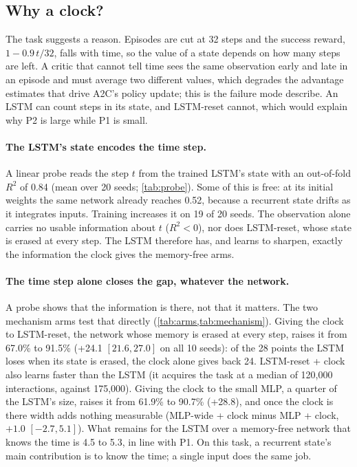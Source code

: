 \subsection{Why a clock?}
\label{sec:part2-why}

The task suggests a reason. Episodes are cut at 32 steps and the
success reward, $1-0.9\,t/32$, falls with time, so the value of a state depends on how many steps
are left. A critic that cannot tell time sees the same observation early and late in an episode
and must average two different values, which degrades the advantage estimates that drive A2C's
policy update; this is the failure mode \citet{pardo2018timelimits} describe. An LSTM can count
steps in its state, and LSTM-reset cannot, which would explain why P2 is large while P1 is small.

\paragraph{The LSTM's state encodes the time step.}
A linear probe reads the step $t$ from the trained LSTM's state with an out-of-fold $R^2$ of 0.84
(mean over 20 seeds; \cref{tab:probe}). Some of this is free: at its initial weights the same
network already reaches 0.52, because a recurrent state drifts as it integrates inputs. Training
increases it on 19 of 20 seeds. The observation alone carries no usable information about $t$
($R^2<0$), nor does LSTM-reset, whose state is erased at every step. The LSTM therefore has, and
learns to sharpen, exactly the information the clock gives the memory-free arms.

\paragraph{The time step alone closes the gap, whatever the network.}
A probe shows that the information is there, not that it matters. The two mechanism arms test
that directly (\cref{tab:arms,tab:mechanism}). Giving the clock to LSTM-reset, the network whose
memory is erased at every step, raises it from 67.0\% to 91.5\% (+24.1\pp{} $[21.6, 27.0]$ on all
10 seeds): of the 28 points the LSTM loses when its state is erased, the clock alone gives back
24. LSTM-reset + clock also learns faster than the LSTM (it acquires the task at a median of
120,000 interactions, against 175,000). Giving the clock to the small MLP, a quarter of the
LSTM's size, raises it from 61.9\% to 90.7\% (+28.8\pp), and once the clock is there width adds
nothing measurable (MLP-wide + clock minus MLP + clock, $+1.0$\pp{} $[-2.7, 5.1]$). What remains
for the LSTM over a memory-free network that knows the time is 4.5 to 5.3\pp, in line with P1.
On this task, a recurrent state's main contribution is to know the time; a single input does the
same job.

